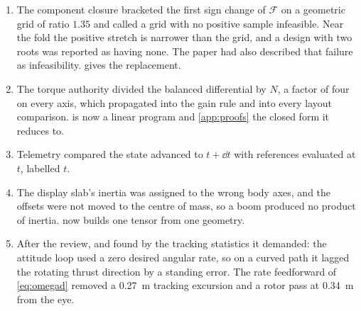 \begin{enumerate}[nosep]
  \item The component closure bracketed the first sign change of
        $\mathcal{F}$ on a geometric grid of ratio $1.35$ and called a grid
        with no positive sample infeasible. Near the fold the positive stretch
        is narrower than the grid, and a design with two roots was reported as
        having none. The paper had also described that failure as
        infeasibility.  gives the replacement.
  \item The torque authority divided the balanced differential by $N$, a
        factor of four on every axis, which propagated into the gain rule and
        into every layout comparison.  is now a linear
        program and \cref{app:proofs} the closed form it reduces to.
  \item Telemetry compared the state advanced to $t+\dd t$ with references
        evaluated at $t$, labelled $t$.
  \item The display slab's inertia was assigned to the wrong body axes, and the
        offsets were not moved to the centre of mass, so a boom produced no
        product of inertia.  now builds one tensor from
        one geometry.
  \item After the review, and found by the tracking statistics it demanded:
        the attitude loop used a zero desired angular rate, so on a curved
        path it lagged the rotating thrust direction by a standing error. The
        rate feedforward of \cref{eq:omegad} removed a \SI{0.27}{\metre}
        tracking excursion and a rotor pass at \SI{0.34}{\metre} from the eye.
\end{enumerate}
